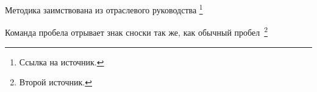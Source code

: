 Методика заимствована из отраслевого руководства \footnote{Ссылка на источник.} %

Команда пробела отрывает знак сноски так же, как обычный пробел\ \footnote{Второй источник.} %

